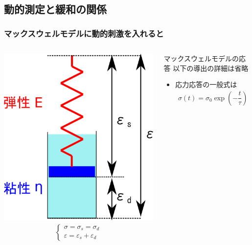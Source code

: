 \documentclass[unicode,12pt]{beamer}%
\begin{document}
\subsection{動的測定と緩和の関係}
\begin{frame}
	\frametitle{マックスウェルモデルに動的刺激を入れると}
		\begin{columns}[c, onlytextwidth]
				\vspace{3mm}
				\includegraphics[width=.9\textwidth]{Maxwell_model.png}
				\begin{align*}
					\begin{cases}
						\sigma = \sigma_s = \sigma_d \\
						\varepsilon = \varepsilon_s + \varepsilon_d
					\end{cases}
				\end{align*}
				\begin{block}{マックスウェルモデルの応答}
					\alert{以下の導出の詳細は省略}
					\begin{itemize}
						\item 応力応答の一般式は
						\vspace{-3mm}
						\begin{align*}
							\sigma(t) = \sigma_0 \exp \left( - \dfrac{t}{\tau} \right)

\end{align*}
\end{itemize}
\end{block}
\end{columns}
\end{frame}
\end{document}
